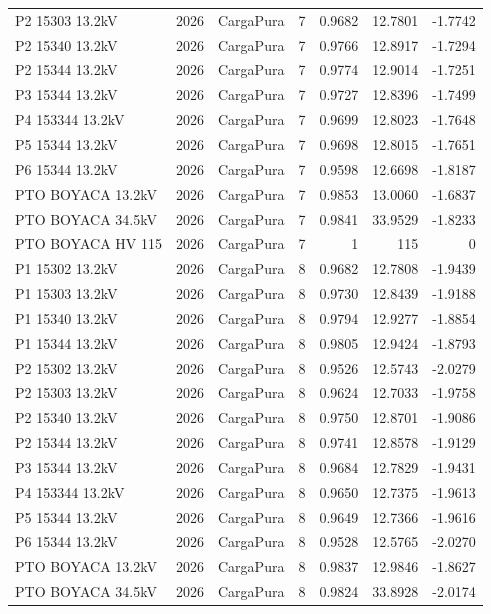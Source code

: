 \documentclass[11pt,a4paper]{article}
\begin{document}
\begin{longtable}{llllrrr}
P2 15303 13.2kV & 2026 & CargaPura & 7 & 0.9682 & 12.7801 & -1.7742 \\
P2 15340 13.2kV & 2026 & CargaPura & 7 & 0.9766 & 12.8917 & -1.7294 \\
P2 15344 13.2kV & 2026 & CargaPura & 7 & 0.9774 & 12.9014 & -1.7251 \\
P3 15344 13.2kV & 2026 & CargaPura & 7 & 0.9727 & 12.8396 & -1.7499 \\
P4 153344 13.2kV & 2026 & CargaPura & 7 & 0.9699 & 12.8023 & -1.7648 \\
P5 15344 13.2kV & 2026 & CargaPura & 7 & 0.9698 & 12.8015 & -1.7651 \\
P6 15344 13.2kV & 2026 & CargaPura & 7 & 0.9598 & 12.6698 & -1.8187 \\
PTO BOYACA 13.2kV & 2026 & CargaPura & 7 & 0.9853 & 13.0060 & -1.6837 \\
PTO BOYACA 34.5kV & 2026 & CargaPura & 7 & 0.9841 & 33.9529 & -1.8233 \\
PTO BOYACA HV 115 & 2026 & CargaPura & 7 & 1 & 115 & 0 \\
P1 15302 13.2kV & 2026 & CargaPura & 8 & 0.9682 & 12.7808 & -1.9439 \\
P1 15303 13.2kV & 2026 & CargaPura & 8 & 0.9730 & 12.8439 & -1.9188 \\
P1 15340 13.2kV & 2026 & CargaPura & 8 & 0.9794 & 12.9277 & -1.8854 \\
P1 15344 13.2kV & 2026 & CargaPura & 8 & 0.9805 & 12.9424 & -1.8793 \\
P2 15302 13.2kV & 2026 & CargaPura & 8 & 0.9526 & 12.5743 & -2.0279 \\
P2 15303 13.2kV & 2026 & CargaPura & 8 & 0.9624 & 12.7033 & -1.9758 \\
P2 15340 13.2kV & 2026 & CargaPura & 8 & 0.9750 & 12.8701 & -1.9086 \\
P2 15344 13.2kV & 2026 & CargaPura & 8 & 0.9741 & 12.8578 & -1.9129 \\
P3 15344 13.2kV & 2026 & CargaPura & 8 & 0.9684 & 12.7829 & -1.9431 \\
P4 153344 13.2kV & 2026 & CargaPura & 8 & 0.9650 & 12.7375 & -1.9613 \\
P5 15344 13.2kV & 2026 & CargaPura & 8 & 0.9649 & 12.7366 & -1.9616 \\
P6 15344 13.2kV & 2026 & CargaPura & 8 & 0.9528 & 12.5765 & -2.0270 \\
PTO BOYACA 13.2kV & 2026 & CargaPura & 8 & 0.9837 & 12.9846 & -1.8627 \\
PTO BOYACA 34.5kV & 2026 & CargaPura & 8 & 0.9824 & 33.8928 & -2.0174 \\

\end{longtable}
\end{document}
